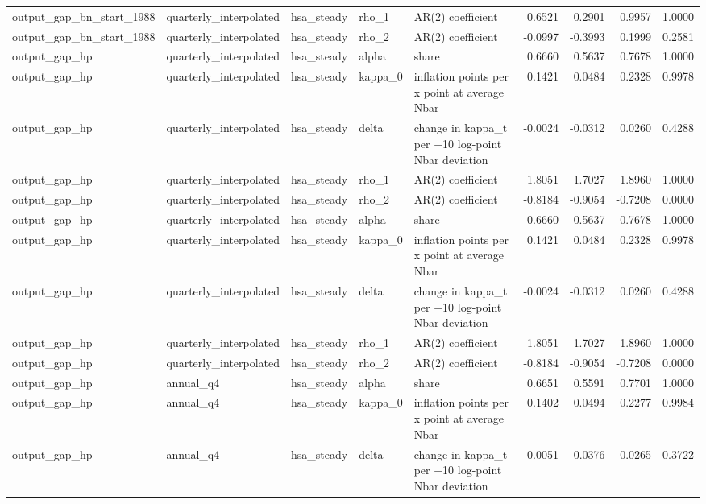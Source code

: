 \begin{tabular}{lllllrrrr}
output\_gap\_bn\_start\_1988 & quarterly\_interpolated & hsa\_steady & rho\_1 & AR(2) coefficient & 0.6521 & 0.2901 & 0.9957 & 1.0000 \\
output\_gap\_bn\_start\_1988 & quarterly\_interpolated & hsa\_steady & rho\_2 & AR(2) coefficient & -0.0997 & -0.3993 & 0.1999 & 0.2581 \\
output\_gap\_hp & quarterly\_interpolated & hsa\_steady & alpha & share & 0.6660 & 0.5637 & 0.7678 & 1.0000 \\
output\_gap\_hp & quarterly\_interpolated & hsa\_steady & kappa\_0 & inflation points per x point at average Nbar & 0.1421 & 0.0484 & 0.2328 & 0.9978 \\
output\_gap\_hp & quarterly\_interpolated & hsa\_steady & delta & change in kappa\_t per +10 log-point Nbar deviation & -0.0024 & -0.0312 & 0.0260 & 0.4288 \\
output\_gap\_hp & quarterly\_interpolated & hsa\_steady & rho\_1 & AR(2) coefficient & 1.8051 & 1.7027 & 1.8960 & 1.0000 \\
output\_gap\_hp & quarterly\_interpolated & hsa\_steady & rho\_2 & AR(2) coefficient & -0.8184 & -0.9054 & -0.7208 & 0.0000 \\
output\_gap\_hp & quarterly\_interpolated & hsa\_steady & alpha & share & 0.6660 & 0.5637 & 0.7678 & 1.0000 \\
output\_gap\_hp & quarterly\_interpolated & hsa\_steady & kappa\_0 & inflation points per x point at average Nbar & 0.1421 & 0.0484 & 0.2328 & 0.9978 \\
output\_gap\_hp & quarterly\_interpolated & hsa\_steady & delta & change in kappa\_t per +10 log-point Nbar deviation & -0.0024 & -0.0312 & 0.0260 & 0.4288 \\
output\_gap\_hp & quarterly\_interpolated & hsa\_steady & rho\_1 & AR(2) coefficient & 1.8051 & 1.7027 & 1.8960 & 1.0000 \\
output\_gap\_hp & quarterly\_interpolated & hsa\_steady & rho\_2 & AR(2) coefficient & -0.8184 & -0.9054 & -0.7208 & 0.0000 \\
output\_gap\_hp & annual\_q4 & hsa\_steady & alpha & share & 0.6651 & 0.5591 & 0.7701 & 1.0000 \\
output\_gap\_hp & annual\_q4 & hsa\_steady & kappa\_0 & inflation points per x point at average Nbar & 0.1402 & 0.0494 & 0.2277 & 0.9984 \\
output\_gap\_hp & annual\_q4 & hsa\_steady & delta & change in kappa\_t per +10 log-point Nbar deviation & -0.0051 & -0.0376 & 0.0265 & 0.3722 \\

\end{tabular}
